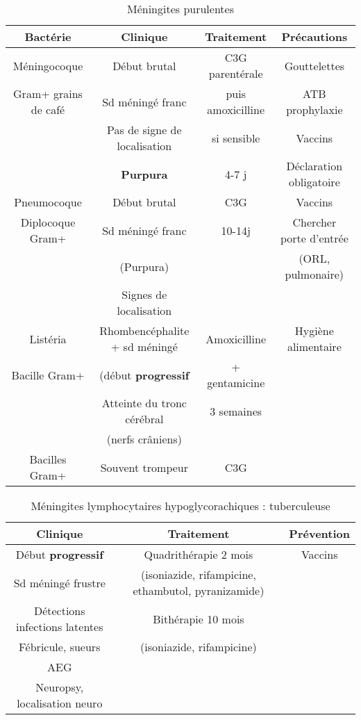 \begin{table}[htpb]
  \centering
  \caption{Méningites purulentes}
  \begin{tabular}{*{4}{c}}
    \toprule
    Bactérie & Clinique & Traitement & Précautions \\
    \midrule
    Méningocoque  & Début brutal  & C3G parentérale  & Gouttelettes  \\
    Gram+ grains de café  & Sd méningé franc  & puis amoxicilline  & ATB
    prophylaxie \\
    & Pas de signe de localisation  & si sensible  & Vaccins  \\
    & \textbf{Purpura} & 4-7 j & Déclaration obligatoire \\
    \hline
    Pneumocoque  & Début brutal  & C3G  & Vaccins  \\
    Diplocoque Gram+ & Sd méningé franc  & 10-14j & Chercher porte d'entrée  \\
    & (Purpura)  & & (ORL, pulmonaire) \\
    & Signes de localisation & & \\
    \hline
    Listéria  & Rhombencéphalite + sd méningé  & Amoxicilline  & Hygiène alimentaire \\
    Bacille Gram+ & (début \textbf{progressif}  & + gentamicine  & \\
    & Atteinte du tronc cérébral  & 3 semaines & \\
    & (nerfs crâniens) & & \\
    \hline
    Bacilles Gram+ & Souvent trompeur & C3G & \\
    \bottomrule
  \end{tabular}
\end{table}

\begin{table}[htpb]
  \centering
  \caption{Méningites lymphocytaires hypoglycorachiques : tuberculeuse}
  \begin{tabular}{*{3}{c}}
    \toprule
    Clinique & Traitement & Prévention \\
    \midrule
    Début \textbf{progressif} & Quadrithérapie 2 mois & Vaccins \\
    Sd méningé frustre & (isoniazide, rifampicine, ethambutol, pyranizamide) & \\
    Détections infections latentes & Bithérapie 10 mois & \\ 
    Fébricule, sueurs &(isoniazide, rifampicine)  & \\
    AEG & & \\
    Neuropsy, localisation neuro & & \\
    \bottomrule
  \end{tabular}
\end{table}

